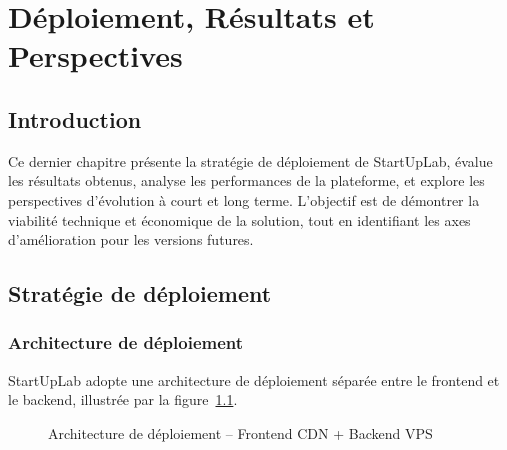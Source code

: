 \chapter{Déploiement, Résultats et Perspectives}

\section*{Introduction}

Ce dernier chapitre présente la stratégie de déploiement de StartUpLab, évalue les résultats obtenus, analyse les performances de la plateforme, et explore les perspectives d'évolution à court et long terme. L'objectif est de démontrer la viabilité technique et économique de la solution, tout en identifiant les axes d'amélioration pour les versions futures.

\section{Stratégie de déploiement}

\subsection{Architecture de déploiement}

StartUpLab adopte une architecture de déploiement séparée entre le frontend et le backend, illustrée par la figure~\ref{fig:deploy-arch}.

\begin{figure}[H]
\centering
{}
\caption{Architecture de déploiement -- Frontend CDN + Backend VPS}
\label{fig:deploy-arch}
\end{figure}

